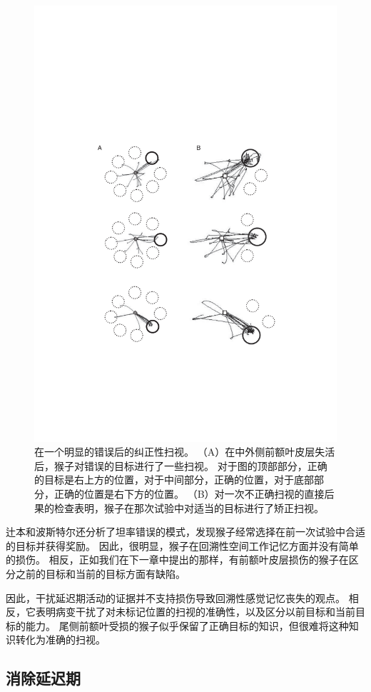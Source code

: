 \begin{figure}
	\centering
	\includegraphics[width=0.7\linewidth]{chap5/Fig_5_8}
	\caption{在一个明显的错误后的纠正性扫视。
		（A）在中外侧前额叶皮层失活后，猴子对错误的目标进行了一些扫视。
		对于图的顶部部分，正确的目标是右上方的位置，对于中间部分，正确的位置，对于底部部分，正确的位置是右下方的位置。
		（B）对一次不正确扫视的直接后果的检查表明，猴子在那次试验中对适当的目标进行了矫正扫视\cite{tsujimoto2012prefrontal}。}
	\label{fig:fig_5_8}
\end{figure}


辻本和波斯特尔还分析了坦率错误的模式，发现猴子经常选择在前一次试验中合适的目标并获得奖励。
因此，很明显，猴子在回溯性空间工作记忆方面并没有简单的损伤。
相反，正如我们在下一章中提出的那样，有前额叶皮层损伤的猴子在区分之前的目标和当前的目标方面有缺陷。


因此，干扰延迟期活动的证据并不支持损伤导致回溯性感觉记忆丧失的观点。
相反，它表明病变干扰了对未标记位置的扫视的准确性，以及区分以前目标和当前目标的能力。
尾侧前额叶受损的猴子似乎保留了正确目标的知识，但很难将这种知识转化为准确的扫视。



\subsection{消除延迟期}


